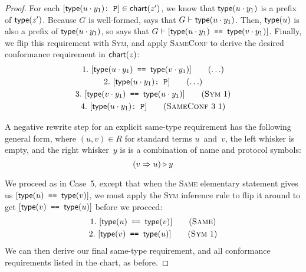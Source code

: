 \documentclass[../generics]{subfiles}
\begin{document}
\begin{proof}
For each $[\texttt{$\mathsf{type}(u\cdot y_1)$:~P}]\in\mathsf{chart}(z^\prime)$, we know that $\mathsf{type}(u\cdot y_1)$ is a prefix of $\mathsf{type}(z^\prime)$. Because $G$ is well-formed,  says that $G\vdash\mathsf{type}(u\cdot y_1)$. Then, $\mathsf{type}(u)$ is also a prefix of $\mathsf{type}(u\cdot y_1)$, so  says that $G\vdash[\texttt{$\mathsf{type}(u\cdot y_1)$ == $\mathsf{type}(v\cdot y_1)$}]$. Finally, we flip this requirement with \textsc{Sym}, and apply \textsc{SameConf} to derive the desired conformance requirement in $\mathsf{chart}(z)$:
\begin{gather*}
\AnyStep{\SameReq{$\Type(u\cdot y_1)$}{$\Type(v\cdot y_1)$}}{1}\\
\AnyStep{\ConfReq{$\Type(u\cdot y_1)$}{P}}{2}\\
\SymStep{1}{$\Type(v\cdot y_1)$}{$\Type(u\cdot y_1)$}{3}\\
\SameConfStep{3}{1}{$\Type(u\cdot y_1)$}{P}{4}
\end{gather*}

 A negative rewrite step for an explicit same-type requirement has the following general form, where $(u,v)\in R$ for standard terms $u$~and~$v$, the left whisker is empty, and the right whisker~$y$ is is a combination of name and protocol symbols:
\[(v\Rightarrow u)\triangleright y\]

We proceed as in Case~5, except that when the \textsc{Same} elementary statement gives us $[\texttt{$\mathsf{type}(u)$ == $\mathsf{type}(v)$}]$, we must apply the \textsc{Sym} inference rule to flip it around to get $[\texttt{$\mathsf{type}(v)$ == $\mathsf{type}(u)$}]$ before we proceed:
\begin{gather*}
\SameStep{$\Type(u)$}{$\Type(v)$}{1}\\
\SymStep{1}{$\Type(v)$}{$\Type(u)$}{2}
\end{gather*}
We can then derive our final same-type requirement, and all conformance requirements listed in the chart, as before.


\end{proof}
\end{document}
